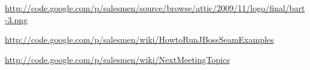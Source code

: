 \documentclass[a4paper, 12pt]{article}
\begin{document}
	\begin{thebibliography}{99}
		\href{http://code.google.com/p/salesmen/source/browse/attic/2009/11/logo/final/bart-3.png}{http://code.google.com/p/salesmen/source/browse/attic/2009/11/logo/final/bart-3.png}
		
			\href{http://code.google.com/p/salesmen/wiki/HowtoRunJBossSeamExamples}{http://code.google.com/p/salesmen/wiki/HowtoRunJBossSeamExamples}
		
		
		\href{http://code.google.com/p/salesmen/wiki/NextMeetingTopics}{http://code.google.com/p/salesmen/wiki/NextMeetingTopics}

		
	\end{thebibliography}	
		
\end{document}
